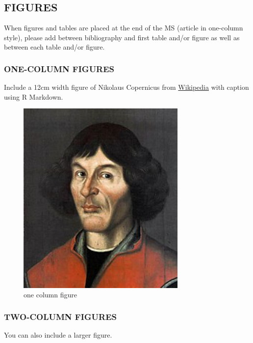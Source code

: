 \documentclass[gmd, manuscript]{copernicus}
\begin{document}
\subsection{FIGURES}

When figures and tables are placed at the end of the MS (article in
one-column style), please add \clearpage between bibliography and first
table and/or figure as well as between each table and/or figure.

\subsubsection{ONE-COLUMN FIGURES}

Include a 12cm width figure of Nikolaus Copernicus from
\href{https://en.wikipedia.org/wiki/File:Nikolaus_Kopernikus.jpg}{Wikipedia}
with caption using R Markdown.

\begin{figure}
\includegraphics[width=8.3cm]{Nikolaus_Kopernikus} \caption{one column figure}\label{fig:unnamed-chunk-2}
\end{figure}

\subsubsection{TWO-COLUMN FIGURES}

You can also include a larger figure.
\end{document}
